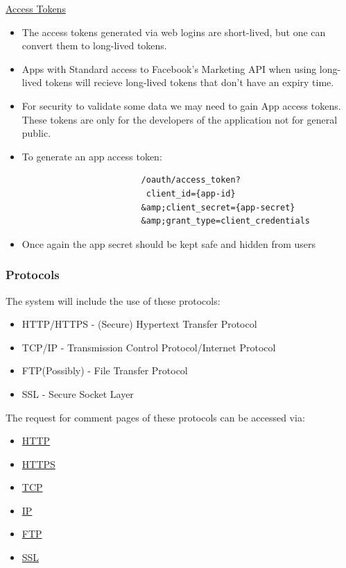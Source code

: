 \documentclass{article}
\begin{document}
			\href{https://developers.facebook.com/docs/facebook-login/access-tokens}{Access Tokens}
			\begin{itemize}
				\item The access tokens generated via web logins are short-lived, but one can convert them to long-lived tokens.
				\item Apps with Standard access to Facebook's Marketing API when using long-lived tokens will recieve long-lived tokens that don't have an expiry time.
				\item For security to validate some data we may need to gain App access tokens. These tokens are only for the developers of the application not for general public.
				\item To generate an app access token:
					\begin{verbatim}
						/oauth/access_token?
					     client_id={app-id}
					    &amp;client_secret={app-secret}
					    &amp;grant_type=client_credentials
					\end{verbatim}
				\item Once again the app secret should be kept safe and hidden from users
			\end{itemize}

		\subsubsection{Protocols}
		The system will include the use of these protocols:
		\begin{itemize}
			\item HTTP/HTTPS - (Secure) Hypertext Transfer Protocol
			\item TCP/IP - Transmission Control Protocol/Internet Protocol
			\item FTP(Possibly) - File Transfer Protocol
			\item SSL - Secure Socket Layer 
		\end{itemize}
		The request for comment pages of these protocols can be accessed via:
		\begin{itemize}
			\item\href{https://tools.ietf.org/html/rfc2616}{HTTP}
			\item\href{https://tools.ietf.org/html/rfc2660}{HTTPS}
			\item\href{https://www.ietf.org/rfc/rfc793.txt}{TCP}
			\item\href{http://www.ietf.org/rfc/rfc0791.txt}{IP}
			\item\href{https://www.ietf.org/rfc/rfc959.txt}{FTP}
			\item\href{https://tools.ietf.org/html/rfc6101}{SSL}
		\end{itemize}
\end{document}
